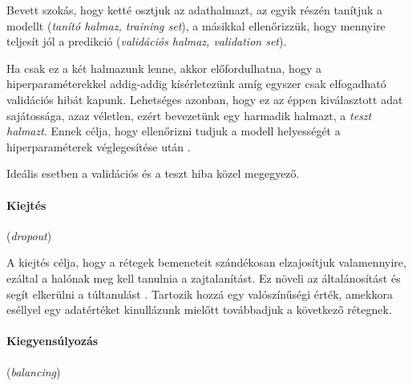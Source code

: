 
Bevett szokás, hogy ketté osztjuk az adathalmazt, az egyik részén tanítjuk a modellt (\textit{tanító halmaz, training set}), a másikkal ellenőrizzük, hogy mennyire teljesít jól a predikció (\textit{validációs halmaz, validation set}).

Ha csak ez a két halmazunk lenne, akkor előfordulhatna, hogy a hiperparaméterekkel addig-addig kísérletezünk amíg egyszer csak elfogadható validációs hibát kapunk. 
Lehetséges azonban, hogy ez az éppen kiválasztott adat sajátossága, azaz véletlen, ezért bevezetünk egy harmadik halmazt, a \textit{teszt halmazt}. Ennek célja, hogy ellenőrizni tudjuk a modell helyességét a hiperparaméterek véglegesítése után \cite{earlystopping}.





Ideális esetben a validációs és a teszt hiba közel megegyező.


\paragraph{Kiejtés} (\textit{dropout})


A kiejtés célja, hogy a rétegek bemeneteit szándékosan elzajosítjuk valamennyire, ezáltal a halónak meg kell tanulnia a zajtalanítást.
Ez növeli az általánosítást és segít elkerülni a túltanulást \cite{earlystopping}. Tartozik hozzá egy valószínűségi érték, amekkora eséllyel egy adatértéket kinullázunk mielőtt továbbadjuk a következő rétegnek.


\paragraph{Kiegyensúlyozás} (\textit{balancing})


